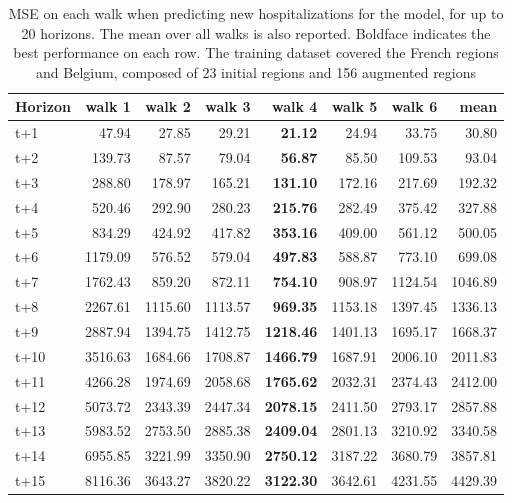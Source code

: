 \begin{table}[H]
\centering
\caption{MSE on each walk when predicting new hospitalizations for the model, for up to 20 horizons. The mean over all walks is also reported. Boldface indicates the best performance on each row. The training dataset covered the French regions and Belgium, composed of 23 initial regions and 156 augmented regions }
\label{tab:MSE_walk_custom_linear_regression}
\begin{tabular}{lrrrrrrr}
\toprule
Horizon &   walk 1 &  walk 2 &  walk 3 &  walk 4 &  walk 5 &  walk 6 &    mean \\
\midrule
t+1  & 47.94  & 27.85  & 29.21  & \textbf{21.12}  & 24.94  & 33.75  & 30.80  \\
t+2  & 139.73  & 87.57  & 79.04  & \textbf{56.87}  & 85.50  & 109.53  & 93.04  \\
t+3  & 288.80  & 178.97  & 165.21  & \textbf{131.10}  & 172.16  & 217.69  & 192.32  \\
t+4  & 520.46  & 292.90  & 280.23  & \textbf{215.76}  & 282.49  & 375.42  & 327.88  \\
t+5  & 834.29  & 424.92  & 417.82  & \textbf{353.16}  & 409.00  & 561.12  & 500.05  \\
t+6  & 1179.09  & 576.52  & 579.04  & \textbf{497.83}  & 588.87  & 773.10  & 699.08  \\
t+7  & 1762.43  & 859.20  & 872.11  & \textbf{754.10}  & 908.97  & 1124.54  & 1046.89  \\
t+8  & 2267.61  & 1115.60  & 1113.57  & \textbf{969.35}  & 1153.18  & 1397.45  & 1336.13  \\
t+9  & 2887.94  & 1394.75  & 1412.75  & \textbf{1218.46}  & 1401.13  & 1695.17  & 1668.37  \\
t+10  & 3516.63  & 1684.66  & 1708.87  & \textbf{1466.79}  & 1687.91  & 2006.10  & 2011.83  \\
t+11  & 4266.28  & 1974.69  & 2058.68  & \textbf{1765.62}  & 2032.31  & 2374.43  & 2412.00  \\
t+12  & 5073.72  & 2343.39  & 2447.34  & \textbf{2078.15}  & 2411.50  & 2793.17  & 2857.88  \\
t+13  & 5983.52  & 2753.50  & 2885.38  & \textbf{2409.04}  & 2801.13  & 3210.92  & 3340.58  \\
t+14  & 6955.85  & 3221.99  & 3350.90  & \textbf{2750.12}  & 3187.22  & 3680.79  & 3857.81  \\
t+15  & 8116.36  & 3643.27  & 3820.22  & \textbf{3122.30}  & 3642.61  & 4231.55  & 4429.39  \\

\end{tabular}
\end{table}
